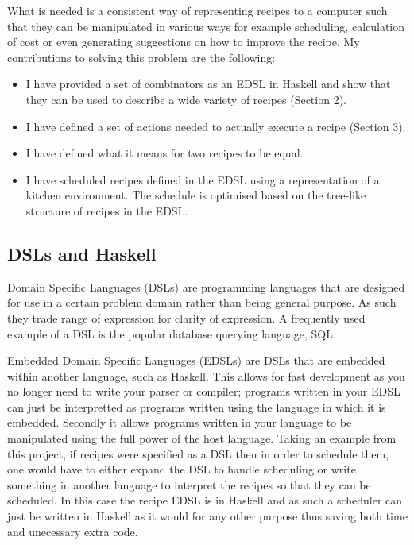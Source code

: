 \documentclass[11pt]{article}
\begin{document}
\medbreak

What is needed is a consistent way of representing recipes to
a computer such that they can be manipulated in various ways
for example scheduling, calculation of cost or even generating
suggestions on how to improve the recipe. My contributions
to solving this problem are the following:

\begin{itemize}
    \item I have provided a set of combinators as an EDSL in Haskell and show that
    they can be used to describe a wide variety of recipes (Section 2).

    \item I have defined a set of actions needed to actually execute a recipe (Section 3).

    \item I have defined what it means for two recipes to be equal.

    \item I have scheduled recipes defined in the EDSL using a representation
    of a kitchen environment. The schedule is optimised based on the tree-like
    structure of recipes in the EDSL.
\end{itemize}

\subsection{DSLs and Haskell}
Domain Specific Languages (DSLs) are programming languages that
are designed for use in a certain problem domain rather than
being general purpose. As such they trade range of expression
for clarity of expression. A frequently used example of a DSL
is the popular database querying language, SQL.

\medbreak

Embedded Domain Specific Languages (EDSLs) are DSLs that are embedded
within another language, such as Haskell. This allows for
fast development as you no longer need to write your parser
or compiler; programs written in your EDSL can just be interpretted
as programs written using the language in which it is embedded.
Secondly it allows programs written in your language to be
manipulated using the full power of the host language. Taking
an example from this project, if recipes were specified as a DSL
then in order to schedule them, one would have to either expand
the DSL to handle scheduling or write something in another language
to interpret the recipes so that they can be scheduled. In this
case the recipe EDSL is in Haskell and as such a scheduler can
just be written in Haskell as it would for any other purpose thus
saving both time and unecessary extra code.
\end{document}
